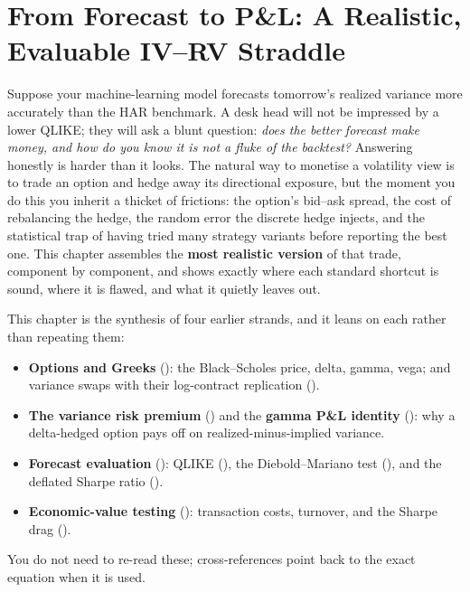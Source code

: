 \chapter{From Forecast to P\&L: A Realistic, Evaluable IV--RV Straddle}
\label{ch:ivrv-straddle}

Suppose your machine-learning model forecasts tomorrow's realized variance more accurately than the HAR benchmark. A desk head will not be impressed by a lower QLIKE; they will ask a blunt question: \emph{does the better forecast make money, and how do you know it is not a fluke of the backtest?} Answering honestly is harder than it looks. The natural way to monetise a volatility view is to trade an option and hedge away its directional exposure, but the moment you do this you inherit a thicket of frictions: the option's bid--ask spread, the cost of rebalancing the hedge, the random error the discrete hedge injects, and the statistical trap of having tried many strategy variants before reporting the best one. This chapter assembles the \textbf{most realistic version} of that trade, component by component, and shows exactly where each standard shortcut is sound, where it is flawed, and what it quietly leaves out.

\begin{prereq}[Background]
This chapter is the synthesis of four earlier strands, and it leans on each rather than repeating them:
\begin{itemize}
  \item \textbf{Options and Greeks} (): the Black--Scholes price, delta, gamma, vega; and variance swaps with their log-contract replication ().
  \item \textbf{The variance risk premium} () and the \textbf{gamma P\&L identity} (): why a delta-hedged option pays off on realized-minus-implied variance.
  \item \textbf{Forecast evaluation} (): QLIKE (), the Diebold--Mariano test (), and the deflated Sharpe ratio ().
  \item \textbf{Economic-value testing} (): transaction costs, turnover, and the Sharpe drag ().
\end{itemize}
You do not need to re-read these; cross-references point back to the exact equation when it is used.
\end{prereq}

